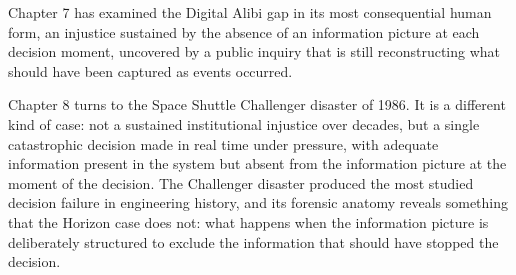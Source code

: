 \scenebreak

Chapter 7 has examined the Digital Alibi gap in its most consequential human form, an injustice sustained by the absence of an information picture at each decision moment, uncovered by a public inquiry that is still reconstructing what should have been captured as events occurred.

Chapter 8 turns to the Space Shuttle Challenger disaster of 1986. It is a different kind of case: not a sustained institutional injustice over decades, but a single catastrophic decision made in real time under pressure, with adequate information present in the system but absent from the information picture at the moment of the decision. The Challenger disaster produced the most studied decision failure in engineering history, and its forensic anatomy reveals something that the Horizon case does not: what happens when the information picture is deliberately structured to exclude the information that should have stopped the decision.
